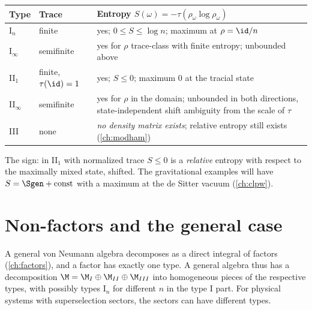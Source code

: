 \begin{center}
\renewcommand{\arraystretch}{1.3}
\begin{tabular}{@{}llp{6.5cm}@{}}
\toprule
Type & Trace & Entropy $S(\omega)=-\tau(\rho_\omega\log\rho_\omega)$\\
\midrule
I$_n$ & finite & yes; $0\le S\le\log n$; maximum at $\rho=\id/n$\\
I$_\infty$ & semifinite & yes for $\rho$ trace-class with finite entropy; unbounded above\\
II$_1$ & finite, $\tau(\id)=1$ & yes; $S\le0$; maximum $0$ at the tracial state\\
II$_\infty$ & semifinite & yes for $\rho$ in the domain; unbounded in both directions, state-independent shift ambiguity from the scale of $\tau$\\
III & none & \emph{no density matrix exists}; relative entropy still exists (\cref{ch:modham})\\
\bottomrule
\end{tabular}
\end{center}
The sign: in II$_1$ with normalized trace $S\le0$ is a \emph{relative} entropy with respect to the maximally mixed state, shifted. The gravitational examples will have $S=\Sgen+\text{const}$ with a maximum at the de Sitter vacuum (\cref{ch:clpw}).

\section{Non-factors and the general case}

A general von Neumann algebra decomposes as a direct integral of factors (\cref{ch:factors}), and a factor has exactly one type. A general algebra thus has a decomposition $\M=\M_I\oplus\M_{II}\oplus\M_{III}$ into homogeneous pieces of the respective types, with possibly types I$_n$ for different $n$ in the type I part. For physical systems with superselection sectors, the sectors can have different types.

